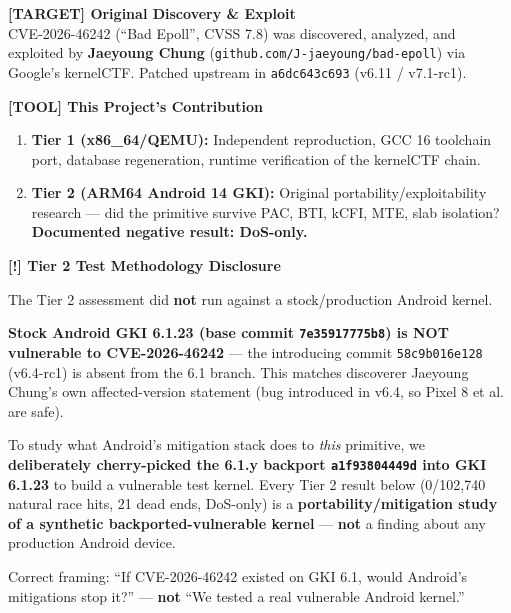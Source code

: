 \documentclass[11pt,a4paper]{article}
\begin{document}
\begin{calloutbox}
\noindent\textbf{\large [TARGET] Original Discovery \& Exploit}\\
CVE-2026-46242 (\enquote{Bad Epoll}, CVSS 7.8) was discovered, analyzed, and exploited by \textbf{Jaeyoung Chung} (\texttt{github.com/J-jaeyoung/bad-epoll}) via Google's kernelCTF. Patched upstream in \texttt{a6dc643c693} (v6.11 / v7.1-rc1).

\vspace{1em}
\noindent\textbf{\large [TOOL] This Project's Contribution}
\begin{enumerate}
  \item \textbf{Tier 1 (x86\_64/QEMU):} Independent reproduction, GCC 16 toolchain port, database regeneration, runtime verification of the kernelCTF chain.
  \item \textbf{Tier 2 (ARM64 Android 14 GKI):} Original portability/exploitability research --- did the primitive survive PAC, BTI, kCFI, MTE, slab isolation? \textbf{Documented negative result: DoS-only.}
\end{enumerate}
\end{calloutbox}

\begin{dangerbox}
\noindent\textbf{\large [!] Tier 2 Test Methodology Disclosure}

The Tier 2 assessment did \textbf{not} run against a stock/production Android kernel.

\textbf{Stock Android GKI 6.1.23 (base commit \texttt{7e35917775b8}) is NOT vulnerable to CVE-2026-46242} --- the introducing commit \texttt{58c9b016e128} (v6.4-rc1) is absent from the 6.1 branch. This matches discoverer Jaeyoung Chung's own affected-version statement (bug introduced in v6.4, so Pixel 8 et al. are safe).

To study what Android's mitigation stack does to \textit{this} primitive, we \textbf{deliberately cherry-picked the 6.1.y backport \texttt{a1f93804449d} into GKI 6.1.23} to build a vulnerable test kernel. Every Tier 2 result below (0/102,740 natural race hits, 21 dead ends, DoS-only) is a \textbf{portability/mitigation study of a synthetic backported-vulnerable kernel} --- \textbf{not} a finding about any production Android device.

Correct framing: \enquote{If CVE-2026-46242 existed on GKI 6.1, would Android's mitigations stop it?} --- \textbf{not} \enquote{We tested a real vulnerable Android kernel.}
\end{dangerbox}
\end{document}
